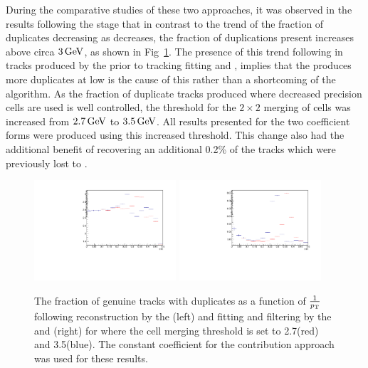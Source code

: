 {During the comparative studies of these two approaches, it was observed in the results following the \DR stage that in contrast to the trend of the fraction of duplicates decreasing as \pT decreases, the fraction of duplications present increases above circa $3\,\text{Ge\hspace{-.08em}V}$, as shown in Fig~\ref{fig:2GeVfracDups}.
The presence of this trend following in tracks produced by the \HT prior to tracking fitting and \DR, implies that the \HT produces more duplicates at low \pT is the cause of this rather than a shortcoming of the \DR algorithm.
As the fraction of duplicate tracks produced where decreased precision \HT cells are used is well controlled, the \pT threshold for the $2 \times 2$ merging of \HT cells was increased from $2.7\,\text{Ge\hspace{-.08em}V}$ to $3.5\,\text{Ge\hspace{-.08em}V}$.
All results presented for the two \MS coefficient forms were produced using this increased threshold. 
This change also had the additional benefit of recovering an additional 0.2\% of the tracks which were previously lost to \MS.

\begin{figure}[tbp]
\centering
\includegraphics[width=0.47\textwidth]{figs/tk-upgrade/results-lowPtTracking/htFracDuplicatesVsInvPtTiltedGeometry_5000.pdf}
\includegraphics[width=0.47\textwidth]{figs/tk-upgrade/results-lowPtTracking/kfFracDuplicatesVsInvPtTiltedGeometry_5000.pdf}
\caption{The fraction of genuine tracks with duplicates as a function of $\frac{1}{p_{\mathrm{T}}}$ following reconstruction by the \HT (left) and fitting and filtering by the \KF and \DR (right) for where the \HT cell merging \pT threshold is set to 2.7\GeV (red) and 3.5\GeV (blue). 
The constant coefficient for the \MS contribution approach was used for these \KF results.
}
\label{fig:2GeVfracDups}
\end{figure}

}
